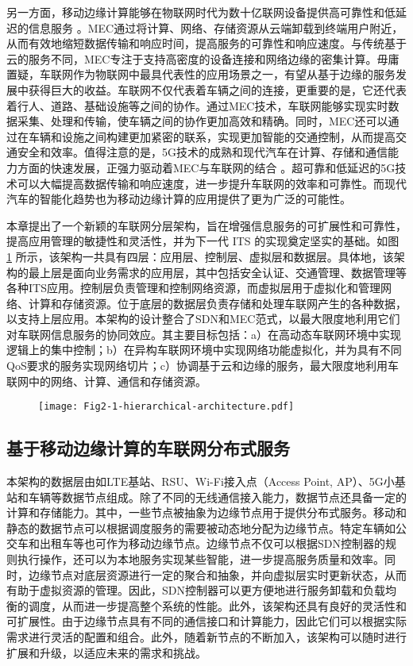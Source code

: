 另一方面，移动边缘计算能够在物联网时代为数十亿联网设备提供高可靠性和低延迟的信息服务 \cite{shi2016edge}。MEC通过将计算、网络、存储资源从云端卸载到终端用户附近，从而有效地缩短数据传输和响应时间，提高服务的可靠性和响应速度。与传统基于云的服务不同，MEC专注于支持高密度的设备连接和网络边缘的密集计算。毋庸置疑，车联网作为物联网中最具代表性的应用场景之一，有望从基于边缘的服务发展中获得巨大的收益。车联网不仅代表着车辆之间的连接，更重要的是，它还代表着行人、道路、基础设施等之间的协作。通过MEC技术，车联网能够实现实时数据采集、处理和传输，使车辆之间的协作更加高效和精确。同时，MEC还可以通过在车辆和设施之间构建更加紧密的联系，实现更加智能的交通控制，从而提高交通安全和效率。值得注意的是，5G技术的成熟和现代汽车在计算、存储和通信能力方面的快速发展，正强力驱动着MEC与车联网的结合 \cite{li2021che}。超可靠和低延迟的5G技术可以大幅提高数据传输和响应速度，进一步提升车联网的效率和可靠性。而现代汽车的智能化趋势也为移动边缘计算的应用提供了更为广泛的可能性。

本章提出了一个新颖的车联网分层架构，旨在增强信息服务的可扩展性和可靠性，提高应用管理的敏捷性和灵活性，并为下一代 ITS 的实现奠定坚实的基础。如图 \ref{fig 2-1} 所示，该架构一共具有四层：应用层、控制层、虚拟层和数据层。具体地，该架构的最上层是面向业务需求的应用层，其中包括安全认证、交通管理、数据管理等各种ITS应用。控制层负责管理和控制网络资源，而虚拟层用于虚拟化和管理网络、计算和存储资源。位于底层的数据层负责存储和处理车联网产生的各种数据，以支持上层应用。本架构的设计整合了SDN和MEC范式，以最大限度地利用它们对车联网信息服务的协同效应。其主要目标包括：a）在高动态车联网环境中实现逻辑上的集中控制；b）在异构车联网环境中实现网络功能虚拟化，并为具有不同QoS要求的服务实现网络切片；c）协调基于云和边缘的服务，最大限度地利用车联网中的网络、计算、通信和存储资源。

\begin{figure}[h] 
	\centering
	\texttt{[image: Fig2-1-hierarchical-architecture.pdf]}
	\label{fig 2-1}
\end{figure}

\subsection{基于移动边缘计算的车联网分布式服务}

本架构的数据层由如LTE基站、RSU、Wi-Fi接入点（Access Point, AP）、5G小基站和车辆等数据节点组成。除了不同的无线通信接入能力，数据节点还具备一定的计算和存储能力。其中，一些节点被抽象为边缘节点用于提供分布式服务。移动和静态的数据节点可以根据调度服务的需要被动态地分配为边缘节点。特定车辆如公交车和出租车等也可作为移动边缘节点。边缘节点不仅可以根据SDN控制器的规则执行操作，还可以为本地服务实现某些智能，进一步提高服务质量和效率。同时，边缘节点对底层资源进行一定的聚合和抽象，并向虚拟层实时更新状态，从而有助于虚拟资源的管理。因此，SDN控制器可以更方便地进行服务卸载和负载均衡的调度，从而进一步提高整个系统的性能。此外，该架构还具有良好的灵活性和可扩展性。由于边缘节点具有不同的通信接口和计算能力，因此它们可以根据实际需求进行灵活的配置和组合。此外，随着新节点的不断加入，该架构可以随时进行扩展和升级，以适应未来的需求和挑战。

